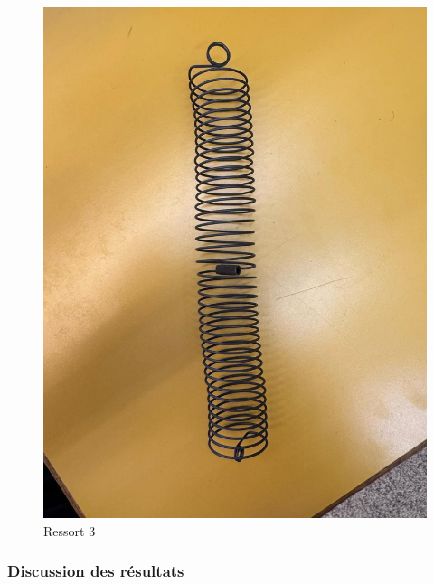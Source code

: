 \begin{figure}[h]
\begin{minipage}{0.32\textwidth}
                    \includegraphics[width=\linewidth]{images/res3.jpeg}
                    \caption{Ressort 3}
                \end{minipage}
            \end{figure}
        \subsubsection{Discussion des résultats}
                    
    


    
    
        
